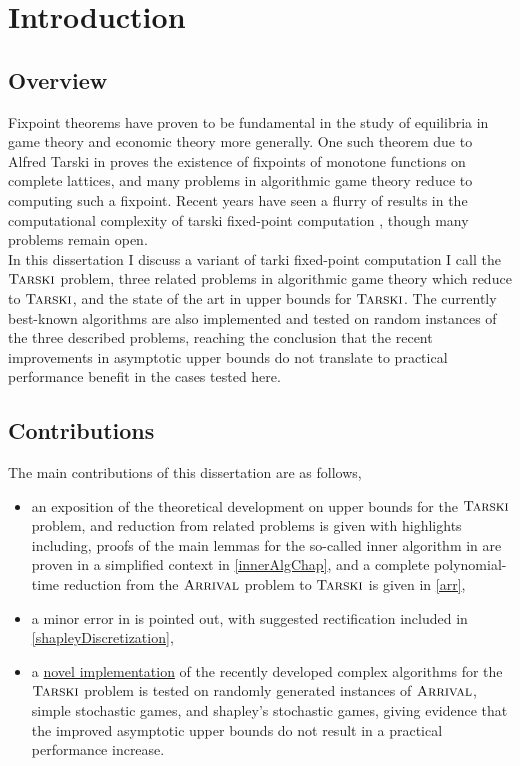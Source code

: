 \chapter{Introduction}
\section{Overview}
Fixpoint theorems have proven to be fundamental in the study of equilibria in
game theory and economic theory more generally. One such theorem due to Alfred Tarski in \citep{tarski}
proves the existence of fixpoints of monotone functions on complete lattices, and
many problems in algorithmic game theory reduce to computing such a fixpoint\citep{lowerBound}. Recent years have seen
a flurry of results in the computational complexity of tarski fixed-point computation \citep{dangQiYe, lowerBound, fasterTarski, chenLi},
though many problems remain open. \\
In this dissertation I discuss a variant of tarki fixed-point computation I call the $\textsc{Tarski}$ problem, three
related problems in algorithmic game theory which reduce to $\textsc{Tarski}$, and the state of the art in upper bounds for $\textsc{Tarski}$.
The currently best-known algorithms are also implemented and tested on random instances of the three described problems, reaching
the conclusion that the recent improvements in asymptotic upper bounds do not translate to practical performance benefit in the cases
tested here.
\section{Contributions}
The main contributions of this dissertation are as follows,
\begin{itemize}
  \item an exposition of the theoretical development on upper bounds for the $\textsc{Tarski}$ problem, and reduction from related problems is given with highlights including,
    proofs of the main lemmas for the so-called inner algorithm in \citep{fasterTarski} are proven in a simplified context in \cref{innerAlgChap}, and a 
    complete polynomial-time reduction from the $\textsc{Arrival}$ problem to $\textsc{Tarski}$ is given in \cref{arr},
  \item a minor error in \citep[Proposition 6.1.]{lowerBound} is pointed out, with suggested rectification included in \cref{shapleyDiscretization},
  \item a \href{https://www.github.com/angusjoshi/tarski}{novel implementation} of the recently developed complex algorithms for the $\textsc{Tarski}$ problem is tested
    on randomly generated instances of $\textsc{Arrival}$, simple stochastic games, and shapley's stochastic games, giving
    evidence that the improved asymptotic upper bounds do not result in a practical performance increase.
\end{itemize}
